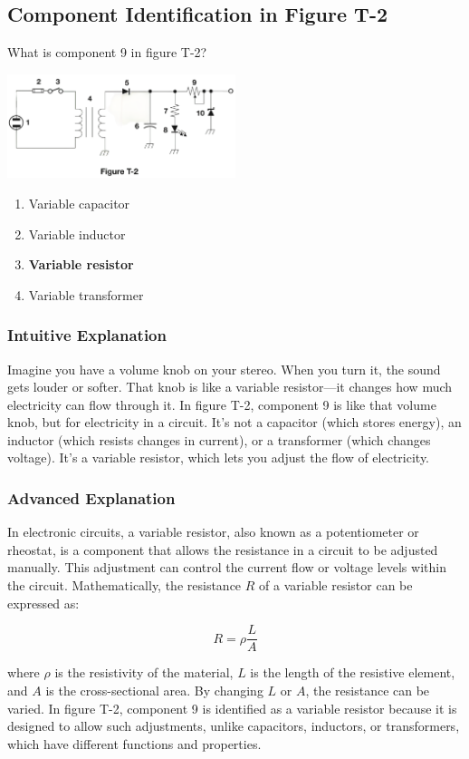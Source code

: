 \subsection{Component Identification in Figure T-2}
\label{T6C08}

\begin{tcolorbox}[colback=gray!10!white,colframe=black!75!black,title=T6C08]
What is component 9 in figure T-2?

\includegraphics[width=0.5\textwidth]{tech/images/t2.png} 

\begin{enumerate}[label=\Alph*)]
    \item Variable capacitor
    \item Variable inductor
    \item \textbf{Variable resistor}
    \item Variable transformer
\end{enumerate}
\end{tcolorbox}

\subsubsection{Intuitive Explanation}
Imagine you have a volume knob on your stereo. When you turn it, the sound gets louder or softer. That knob is like a variable resistor—it changes how much electricity can flow through it. In figure T-2, component 9 is like that volume knob, but for electricity in a circuit. It’s not a capacitor (which stores energy), an inductor (which resists changes in current), or a transformer (which changes voltage). It’s a variable resistor, which lets you adjust the flow of electricity.

\subsubsection{Advanced Explanation}
In electronic circuits, a variable resistor, also known as a potentiometer or rheostat, is a component that allows the resistance in a circuit to be adjusted manually. This adjustment can control the current flow or voltage levels within the circuit. Mathematically, the resistance \( R \) of a variable resistor can be expressed as:

\[ R = \rho \frac{L}{A} \]

where \( \rho \) is the resistivity of the material, \( L \) is the length of the resistive element, and \( A \) is the cross-sectional area. By changing \( L \) or \( A \), the resistance can be varied. In figure T-2, component 9 is identified as a variable resistor because it is designed to allow such adjustments, unlike capacitors, inductors, or transformers, which have different functions and properties.

